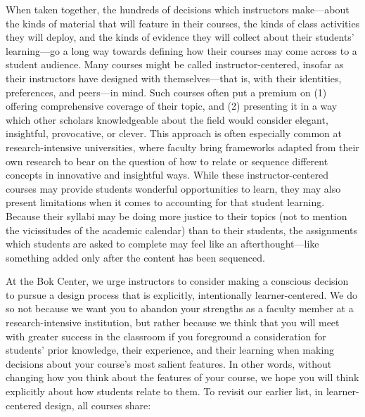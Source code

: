 When taken together, the hundreds of decisions which instructors make—about the kinds of material that will feature in their courses, the kinds of class activities they will deploy, and the kinds of evidence they will collect about their students' learning—go a long way towards defining how their courses may come across to a student audience. Many courses might be called instructor-centered, insofar as their instructors have designed with themselves—that is, with their identities, preferences, and peers—in mind. Such courses often put a premium on (1) offering comprehensive coverage of their topic, and (2) presenting it in a way which other scholars knowledgeable about the field would consider elegant, insightful, provocative, or clever. This approach is often especially common at research-intensive universities, where faculty bring frameworks adapted from their own research to bear on the question of how to relate or sequence different concepts in innovative and insightful ways. While these instructor-centered courses may provide students wonderful opportunities to learn, they may also present limitations when it comes to accounting for that student learning. Because their syllabi may be doing more justice to their topics (not to mention the vicissitudes of the academic calendar) than to their students, the assignments which students are asked to complete may feel like an afterthought—like something added only after the content has been sequenced.


At the Bok Center, we urge instructors to consider making a conscious decision to pursue a design process that is explicitly, intentionally learner-centered. We do so not because we want you to abandon your strengths as a faculty member at a research-intensive institution, but rather because we think that you will meet with greater success in the classroom if you foreground a consideration for students’ prior knowledge, their experience, and their learning when making decisions about your course’s most salient features. In other words, without changing how you think about the features of your course, we hope you will think explicitly about how students relate to them. To revisit our earlier list, in learner-centered design, all courses share:

